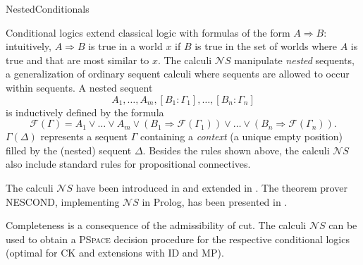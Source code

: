 \begin{entry}{NestedConditionals}

 \begin{clarifications}
Conditional logics extend classical logic with formulas of the form $A \Rightarrow B$: intuitively, $A \Rightarrow B$ is true in a world $x$ if $B$ is true in the set of worlds where $A$ is true and that are most similar to $x$. The calculi $\mathcal{N}S$ manipulate \emph{nested} sequents, a generalization of ordinary sequent calculi where sequents are allowed to occur within sequents. A nested sequent $$A_1, \dots, A_m, [B_1: \Gamma_1], \dots, [B_n: \Gamma_n]$$ is inductively defined by the formula $$\mathcal{F}(\Gamma)=A_1 \vee \dots \vee A_m \vee (B_1 \Rightarrow \mathcal{F}(\Gamma_1)) \vee \dots \vee (B_n \Rightarrow \mathcal{F}(\Gamma_n)).$$ $\Gamma(\Delta)$ represents a sequent $\Gamma$ containing a \emph{context} (a unique empty position) filled by the (nested) sequent $\Delta$.
  Besides the rules shown above, the calculi $\mathcal{N}S$ also include standard 
   rules for propositional connectives.
 \end{clarifications}

 \begin{history}
  The calculi $\mathcal{N}S$ have been introduced in 
  \cite{jelia2012pozz} and extended  in \cite{jlcpozz}. The theorem prover NESCOND, implementing $\mathcal{N}S$ in Prolog, has been presented in \cite{ijcarpozz}.
 \end{history}

 \begin{technicalities}
Completeness is a consequence of the admissibility of cut. The calculi $\mathcal{N}S$ can be used to obtain a \textsc{PSpace} decision procedure for the respective conditional logics (optimal for CK and extensions with ID and MP).
 \end{technicalities}




\end{entry}
